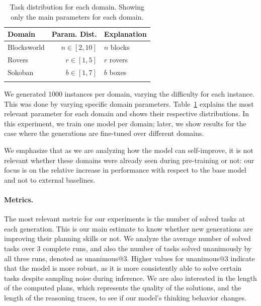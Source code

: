 \documentclass{article}
\begin{document}
\begin{table}
\vspace{-10pt}
\centering
\begin{tabular}{lrl}
\toprule
\textbf{Domain} & \textbf{Param. Dist.} & \textbf{Explanation} \\ \midrule
Blocksworld     & $n \in [2,10]$        & $n$ blocks              \\
Rovers          & $r \in [1,5]$         & $r$ rovers              \\
Sokoban         & $b \in [1,7]$         & $b$ boxes               \\
\bottomrule                                                       \\
\end{tabular}
\caption{Task distribution for each domain. Showing only the
  main parameters for each domain.}
\label{tab:domain-params}
\vspace{-10pt}
\end{table}



We generated 1000 instances per domain,  varying the difficulty for each instance. This was done by varying specific domain parameters.
Table~\ref{tab:domain-params} explains the
most relevant parameter for each domain and shows their respective
distributions. In this experiment, we train one model per domain; later, we show
results for the case where the generations are fine-tuned over different
domains.

We emphasize that as we are analyzing how the model can self-improve, it is not
relevant whether these domains were already seen during pre-training or not: our
focus is on the relative increase in performance with respect to the base model and not
to external baselines.

\paragraph{Metrics.}

The most relevant metric for our experiments is the number of solved tasks at
each generation. This is our main estimate to know whether new generations are
improving their planning skills or not. We analyze the average number of
solved tasks over 3 complete runs, and also the number of tasks solved
unanimously by all three runs, denoted as unanimous@3. Higher values for
unanimous@3 indicate that the model is more robust, as it is more consistently
able to solve certain tasks despite sampling noise during inference. We are also
interested in the length of the computed plans, which represents the quality of
the solutions, and the length of the reasoning traces, to see if our model's
thinking behavior changes.
\end{document}
